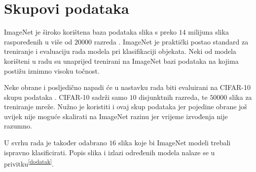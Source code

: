\documentclass[utf8, diplomski]{fer}
\begin{document}
\section{Skupovi podataka}
ImageNet je široko korištena baza podataka slika s preko $14$ milijuna slika raspoređenih u više od $20000$ razreda \citep{ILSVRC15}. ImageNet je praktički postao standard za treniranje i evaluaciju rada modela pri klasifikaciji objekata. Neki od modela korišteni u radu su unaprijed trenirani na ImageNet bazi podataka na kojima postižu iznimno visoku točnost.
\par
Neke obrane i posljedično napadi će u nastavku rada biti evaluirani na CIFAR-10 skupu podataka \citep{cifar10}. CIFAR-10 sadrži samo $10$ disjunktnih razreda, te $50000$ slika za treniranje mreže. Nužno je koristiti i ovaj skup podataka jer pojedine obrane još uvijek nije moguće skalirati na ImageNet razinu jer vrijeme izvođenja nije razumno.
\par
U svrhu rada je također odabrano $16$ slika koje bi ImageNet modeli trebali ispravno klasificirati. Popis slika i izlazi određenih modela nalaze se u privitku\textsuperscript{\ref{dodatak}}.
\end{document}
